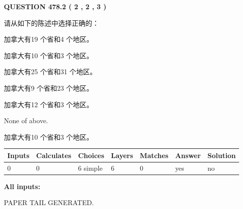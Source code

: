 \documentclass{ctexart}
\begin{document}
   
  
\vspace{0.2in}
  
{\textbf{\Large{QUESTION
478.2 
 ( 2 , 2 , 3 )
}}}
  
  
请从如下的陈述中选择正确的：
 
 
加拿大有19 个省和4 个地区。
 
 
加拿大有10 个省和3 个地区。
 
 
加拿大有25 个省和31 个地区。
 
 
加拿大有9 个省和23 个地区。
 
 
加拿大有12 个省和3 个地区。
 
 
 None of above.
 
 
\noindent{}
 
 
加拿大有10 个省和3 个地区。
 
 
\noindent{}
 
 
   
   
   
   
\noindent\begin{tabular}{|l|l|l|l|l|l|l|}
 \hline
Inputs & Calculates & Choices & Layers & Matches & Answer & Solution \\ \hline
 0  & 
 0  & 
 6
  simple  
  & 
 6  & 
 0  & 
  yes & 
  no 
  \\ \hline
 \end{tabular}
   
   
   
   
\noindent{}
   
   
   
   
\noindent\vspace{0.1in}\hspace{-0.08in} {\textbf{\Large{All inputs: }}}
   
   
   
   
   
   
 \vspace{0.2in}
 
   
   
\vspace{2.0in} PAPER TAIL GENERATED.
   
\end{document}

